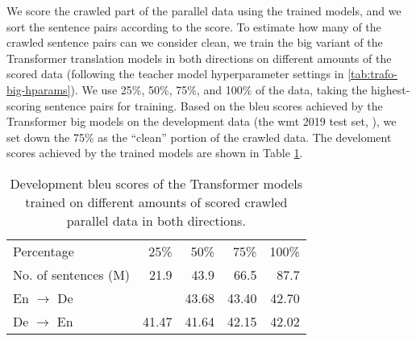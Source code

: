 We score the crawled part of the parallel data using the trained models, and we
sort the sentence pairs according to the score. To estimate how many of the
crawled sentence pairs can we consider clean, we train the big variant of the
Transformer translation models in both directions on different amounts of the
scored data (following the teacher model hyperparameter settings in
\ref{tab:trafo-big-hparams}). We use 25\%, 50\%, 75\%, and 100\% of the data,
taking the highest-scoring sentence pairs for training. Based on the \acs{bleu}
scores achieved by the Transformer big models on the development data (the
\ac{wmt} 2019 test set, \citealp{barrault-etal-2019-findings}), we set down the
75\% as the ``clean'' portion of the crawled data. The develoment scores
achieved by the trained models are shown in Table
\ref{tab:dual-cross-entropy-selection}.

\begin{table}
  \centering
  \begin{tabular}{lrrrr}
    \toprule
    Percentage & 25\% & 50\% & 75\% & 100\% \\
    No. of sentences (M) & 21.9  & 43.9 & 66.5 & 87.7 \\
    \midrule
    En $\rightarrow$ De &  & 43.68 & 43.40 & 42.70 \\
    De $\rightarrow$ En & 41.47 & 41.64 & 42.15 & 42.02 \\
    \bottomrule
  \end{tabular}
  \caption{Development \acs{bleu} scores of the Transformer models trained on
    different amounts of scored crawled parallel data in both directions.}%
  \label{tab:dual-cross-entropy-selection}
\end{table}



